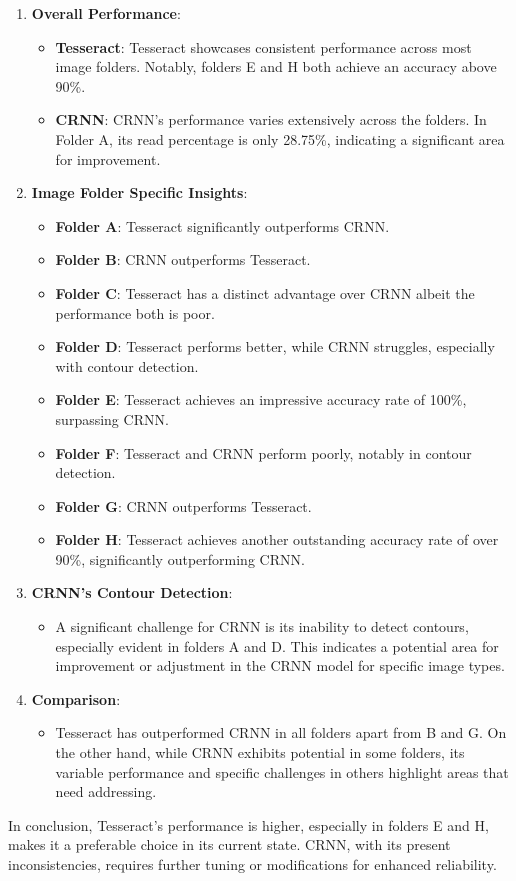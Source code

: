 \begin{enumerate}
    \item \textbf{Overall Performance}:
          \begin{itemize}
              \item \textbf{Tesseract}: Tesseract showcases consistent performance across most image folders. Notably, folders E and H both achieve an accuracy above 90\%.
              \item \textbf{CRNN}: CRNN's performance varies extensively across the folders. In Folder A, its read percentage is only 28.75\%, indicating a significant area for improvement.
          \end{itemize}

    \item \textbf{Image Folder Specific Insights}:
          \begin{itemize}
              \item \textbf{Folder A}: Tesseract significantly outperforms CRNN.
              \item \textbf{Folder B}: CRNN outperforms Tesseract.
              \item \textbf{Folder C}: Tesseract has a distinct advantage over CRNN albeit the performance both is poor.
              \item \textbf{Folder D}: Tesseract performs better, while CRNN struggles, especially with contour detection.
              \item \textbf{Folder E}: Tesseract achieves an impressive accuracy rate of 100\%, surpassing CRNN.
              \item \textbf{Folder F}: Tesseract and CRNN perform poorly, notably in contour detection.
              \item \textbf{Folder G}: CRNN outperforms Tesseract.
              \item \textbf{Folder H}: Tesseract achieves another outstanding accuracy rate of over 90\%, significantly outperforming CRNN.
          \end{itemize}

    \item \textbf{CRNN's Contour Detection}:
          \begin{itemize}
              \item A significant challenge for CRNN is its inability to detect contours, especially evident in folders A and D. This indicates a potential area for improvement or adjustment in the CRNN model for specific image types.
          \end{itemize}

    \item \textbf{Comparison}:
          \begin{itemize}
              \item Tesseract has outperformed CRNN in all folders apart from B and G. On the other hand, while CRNN exhibits potential in some folders, its variable performance and specific challenges in others highlight areas that need addressing.
          \end{itemize}

\end{enumerate}

In conclusion, Tesseract's performance is higher, especially in folders E and H, makes it a preferable choice in its current state. CRNN, with its present inconsistencies, requires further tuning or modifications for enhanced reliability.



